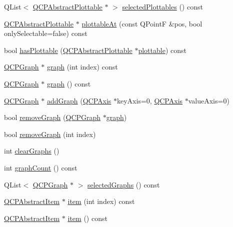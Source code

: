\begin{DoxyCompactItemize}
\item 
Q\-List$<$ \hyperlink{classQCPAbstractPlottable}{Q\-C\-P\-Abstract\-Plottable} $\ast$ $>$ \hyperlink{classQCustomPlot_a6721b8c689bb7f2f400987e580508fe8}{selected\-Plottables} () const 
\item 
\hyperlink{classQCPAbstractPlottable}{Q\-C\-P\-Abstract\-Plottable} $\ast$ \hyperlink{classQCustomPlot_ac1d1bc6ae4e13616fb02cef6d9e2188e}{plottable\-At} (const Q\-Point\-F \&pos, bool only\-Selectable=false) const 
\item 
bool \hyperlink{classQCustomPlot_a4fc28914e2ee91aab424b7ce46b6bdf1}{has\-Plottable} (\hyperlink{classQCPAbstractPlottable}{Q\-C\-P\-Abstract\-Plottable} $\ast$\hyperlink{classQCustomPlot_a32de81ff53e263e785b83b52ecd99d6f}{plottable}) const 
\item 
\hyperlink{classQCPGraph}{Q\-C\-P\-Graph} $\ast$ \hyperlink{classQCustomPlot_a6d3ed93c2bf46ab7fa670d66be4cddaf}{graph} (int index) const 
\item 
\hyperlink{classQCPGraph}{Q\-C\-P\-Graph} $\ast$ \hyperlink{classQCustomPlot_a80c40ced2a74eefe9e92de1e82ba2274}{graph} () const 
\item 
\hyperlink{classQCPGraph}{Q\-C\-P\-Graph} $\ast$ \hyperlink{classQCustomPlot_a6fb2873d35a8a8089842d81a70a54167}{add\-Graph} (\hyperlink{classQCPAxis}{Q\-C\-P\-Axis} $\ast$key\-Axis=0, \hyperlink{classQCPAxis}{Q\-C\-P\-Axis} $\ast$value\-Axis=0)
\item 
bool \hyperlink{classQCustomPlot_a903561be895fb6528a770d66ac5e6713}{remove\-Graph} (\hyperlink{classQCPGraph}{Q\-C\-P\-Graph} $\ast$\hyperlink{classQCustomPlot_a6d3ed93c2bf46ab7fa670d66be4cddaf}{graph})
\item 
bool \hyperlink{classQCustomPlot_a9554b3d2d5b10c0f884bd4010b6c192c}{remove\-Graph} (int index)
\item 
int \hyperlink{classQCustomPlot_ab0f3abff2d2f7df3668b5836f39207fa}{clear\-Graphs} ()
\item 
int \hyperlink{classQCustomPlot_a7d9b4d19114b2fde60f0233eeb0aa682}{graph\-Count} () const 
\item 
Q\-List$<$ \hyperlink{classQCPGraph}{Q\-C\-P\-Graph} $\ast$ $>$ \hyperlink{classQCustomPlot_ad2a0493bdd01e7aa99a4209ae3a5b67b}{selected\-Graphs} () const 
\item 
\hyperlink{classQCPAbstractItem}{Q\-C\-P\-Abstract\-Item} $\ast$ \hyperlink{classQCustomPlot_a3e842b5a65b1d17fbb96cfb1fa1314d1}{item} (int index) const 
\item 
\hyperlink{classQCPAbstractItem}{Q\-C\-P\-Abstract\-Item} $\ast$ \hyperlink{classQCustomPlot_a700399eae539798c5baf64a37c7f2135}{item} () const 

\end{DoxyCompactItemize}
